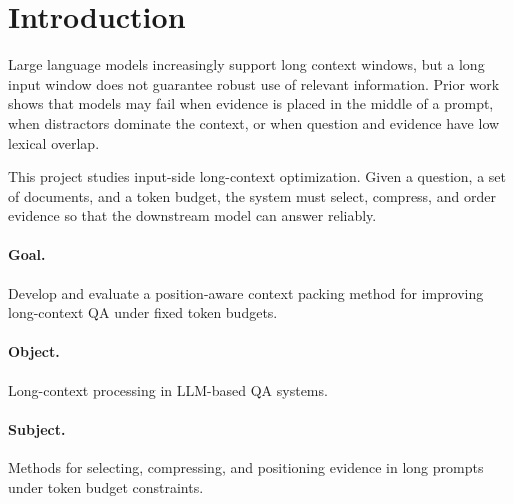 \section{Introduction}

Large language models increasingly support long context windows, but a long
input window does not guarantee robust use of relevant information. Prior work
shows that models may fail when evidence is placed in the middle of a prompt,
when distractors dominate the context, or when question and evidence have low
lexical overlap.

This project studies input-side long-context optimization. Given a question,
a set of documents, and a token budget, the system must select, compress, and
order evidence so that the downstream model can answer reliably.

\paragraph{Goal.}
Develop and evaluate a position-aware context packing method for improving
long-context QA under fixed token budgets.

\paragraph{Object.}
Long-context processing in LLM-based QA systems.

\paragraph{Subject.}
Methods for selecting, compressing, and positioning evidence in long prompts
under token budget constraints.
